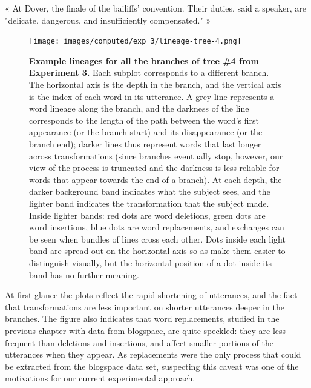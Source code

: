 \begin{nquote} %
  « At Dover, the finale of the bailiffs' convention. Their duties, said a speaker, are "delicate, dangerous, and insufficiently compensated." »
\end{nquote}

\begin{figure}[!h]
  \centering
  \texttt{[image: images/computed/exp\_3/lineage-tree-4.png]}
  \caption[Example lineages for all the branches of tree \#4 from Experiment 3]{
  \textbf{Example lineages for all the branches of tree \#4 from Experiment 3.}
  Each subplot corresponds to a different branch.
  The horizontal axis is the depth in the branch, and the vertical axis is the index of each word in its utterance.
  A grey line represents a word lineage along the branch, and the darkness of the line corresponds to the length of the path between the word's first appearance (or the branch start) and its disappearance (or the branch end);
  darker lines thus represent words that last longer across transformations (since branches eventually stop, however, our view of the process is truncated and the darkness is less reliable for words that appear towards the end of a branch).
  At each depth, the darker background band indicates what the subject sees, and the lighter band indicates the transformation that the subject made.
  Inside lighter bands:
  red dots are word deletions, green dots are word insertions, blue dots are word replacements, and exchanges can be seen when bundles of lines cross each other.
  Dots inside each light band are spread out on the horizontal axis so as make them easier to distinguish visually, but the horizontal position of a dot inside its band has no further meaning.
  }
  \label{fig:gistr-lineage-tree}
\end{figure}

At first glance the plots reflect the rapid shortening of utterances,
and the fact that transformations are less important on shorter
utterances deeper in the branches. The figure also indicates that word
replacements, studied in the previous chapter with data from blogspace,
are quite speckled: they are less frequent than deletions and
insertions, and affect smaller portions of the utterances when they
appear. As replacements were the only process that could be extracted
from the blogspace data set, suspecting this caveat was one of the
motivations for our current experimental approach.

